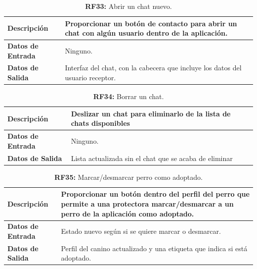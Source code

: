 \documentclass[a4paper, 12pt]{article}
\begin{document}
\begin{table}[H]
\captionsetup{justification=raggedright,singlelinecheck=false}
\caption{\textbf{RF33:} Abrir un chat nuevo.}
\label{tab:RF33}
	\begin{tabular}{|m{5cm}|m{10cm}|}
	\hline
	\textbf{Descripción} & Proporcionar un botón de contacto para abrir un chat con algún usuario dentro de la aplicación. \\ 
	\hline
	\textbf{Datos de Entrada} & Ninguno. \\ 
	\hline
	\textbf{Datos de Salida} & Interfaz del chat, con la cabecera que incluye los datos del usuario receptor. \\ 
	\hline
\end{tabular}
\end{table}

\begin{table}[H]
\captionsetup{justification=raggedright,singlelinecheck=false}
\caption{\textbf{RF34:} Borrar un chat.}
\label{tab:RF34}
	\begin{tabular}{|m{5cm}|m{10cm}|}
	\hline
	\textbf{Descripción} & Deslizar un chat para eliminarlo de la lista de chats disponibles \\ 
	\hline
	\textbf{Datos de Entrada} & Ninguno. \\ 
	\hline
	\textbf{Datos de Salida} & Lista actualizada sin el chat que se acaba de eliminar \\ 
	\hline
\end{tabular}
\end{table}

\begin{table}[H]
\captionsetup{justification=raggedright,singlelinecheck=false}
\caption{\textbf{RF35:} Marcar/desmarcar perro como adoptado.}
\label{tab:RF35}
	\begin{tabular}{|m{5cm}|m{10cm}|}
	\hline
	\textbf{Descripción} & Proporcionar un botón dentro del perfil del perro que permite a una protectora marcar/desmarcar a un perro de la aplicación como adoptado. \\ 
	\hline
	\textbf{Datos de Entrada} & Estado nuevo según si se quiere marcar o desmarcar. \\ 
	\hline
	\textbf{Datos de Salida} & Perfil del canino actualizado y una etiqueta que indica si está adoptado. \\ 
	\hline
\end{tabular}
\end{table}
\end{document}
